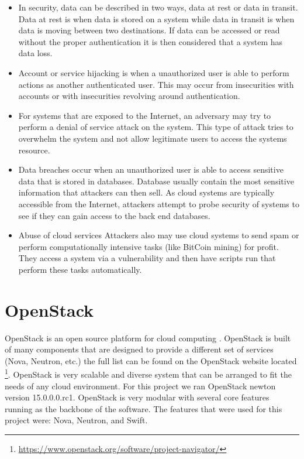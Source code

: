 \documentclass[12pt]{article}
\begin{document}
\begin{itemize}
    \item In security, data can be described in two ways, data at rest or data in transit. Data at rest is when data is stored on a system while data in transit is when data is moving between two destinations. If data can be accessed or read without the proper authentication it is then considered that a system has data loss.
    \item Account or service hijacking is when a unauthorized user is able to perform actions as another authenticated user. This may occur from insecurities with accounts or with insecurities revolving around authentication.
    \item For systems that are exposed to the Internet, an adversary may try to perform a denial of service attack on the system. This type of attack tries to overwhelm the system and not allow legitimate users to access the systems resource.
    \item Data breaches occur when an unauthorized user is able to access sensitive data that is stored in databases. Database usually contain the most sensitive information that attackers can then sell. As cloud systems are typically accessible from the Internet, attackers attempt to probe security of systems to see if they can gain access to the back end databases.
    \item Abuse of cloud services Attackers also may use cloud systems to send spam or perform computationally intensive tasks (like BitCoin mining) for profit. They access a system via a vulnerability and then have scripts run that perform these tasks automatically.
\end{itemize}

\section{OpenStack}
OpenStack is an open source platform for cloud computing \cite{OpenStack}. OpenStack is built of many components that are designed to provide a different set of services (Nova, Neutron, etc.) the full list can be found on the OpenStack website located \footnote{ \href{https://www.openstack.org/software/project-navigator/}{https://www.openstack.org/software/project-navigator/}}. OpenStack is very scalable and diverse system that can be arranged to fit the needs of any cloud environment. For this project we ran OpenStack newton version 15.0.0.0.rc1. OpenStack is very modular with several core features running as the backbone of the software. The features that were used for this project were: Nova, Neutron, and Swift.
\end{document}
